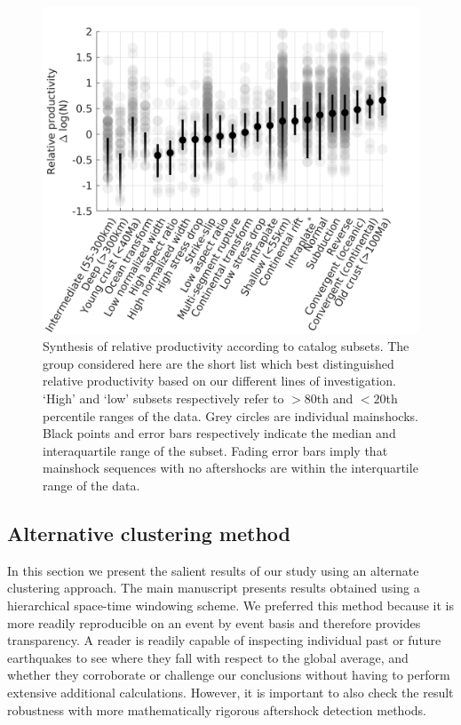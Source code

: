 \documentclass[draft]{agujournal}
\begin{document}
\begin{figure}[H]
\centering

\includegraphics{figures/cal_tech_mw5.png}
\caption{Synthesis of relative productivity  according to catalog subsets. The group considered here are the short list which best distinguished relative productivity based on our different lines of investigation. `High' and `low' subsets respectively refer to $>\!\!80$th and $<\!\!20$th percentile ranges of the data. Grey circles are individual mainshocks. Black points and error bars respectively indicate the median and interaquartile range of the subset. Fading error bars imply that mainshock sequences with no aftershocks are within the interquartile range of the data.}
\label{fig:caltech}
\end{figure}   

\newpage
\subsection{Alternative clustering method}\label{sec:alt}

In this section we present the salient results of our study using an alternate clustering approach. The main manuscript presents results obtained using a hierarchical space-time windowing scheme. We preferred this method because it is more readily reproducible on an event by event basis and therefore provides  transparency.  A reader is readily capable of inspecting individual past or future earthquakes to see where they fall with respect to the global average, and whether they corroborate or challenge our conclusions without having to perform extensive additional calculations. However, it is important to also check the result robustness with more mathematically rigorous aftershock detection methods.   
\end{document}

